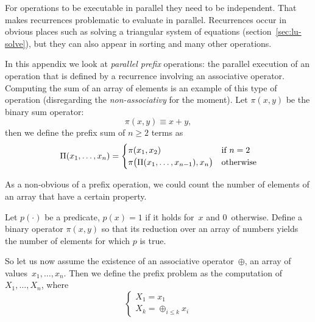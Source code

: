 
For operations to be executable in parallel they need to be independent.
That makes recurrences problematic to evaluate in parallel.
Recurrences occur in obvious places such as solving a triangular system 
of equations (section~\ref{sec:lu-solve}),
but they can also appear in sorting and many other operations.

In this appendix we look at \emph{parallel prefix} operations: the
parallel execution of an operation that is defined by a recurrence
involving an associative operator.  Computing the sum of an array of
elements is an example of this type of operation (disregarding the
\emph{non-associativy}%
for the moment).
Let $\pi(x,y)$ be the binary sum operator: \[ \pi(x,y)\equiv x+y, \]
then we define the prefix sum of $n\geq 2$ terms as
\[ \Pi(x_1,\ldots,x_n) =
\begin{cases}
\pi(x_1,x_2)&\hbox{if $n=2$}\\
\pi\bigl( \Pi(x_1,\ldots,x_{n-1}),x_n\bigr)&\hbox{otherwise} \\
\end{cases}
\]

As a non-obvious of a prefix operation, we could count the number of elements
of an array that have a certain property.

\begin{exercise}
  Let $p(\cdot)$ be a predicate, $p(x)=1$ if it holds for~$x$
  and 0~otherwise. Define a binary operator $\pi(x,y)$ so that
  its reduction over an array of numbers yields the number of 
  elements for which $p$ is true.
\end{exercise}

So let us now assume the existence of an associative operator~$\oplus$,
an array of values~$x_1,\ldots,x_n$. Then we define the prefix problem
as the computation of $X_1,\ldots,X_n$, where
\[
\begin{cases}
  X_1=x_1\\
  X_k=\oplus_{i\leq k} x_i
\end{cases}
\]

